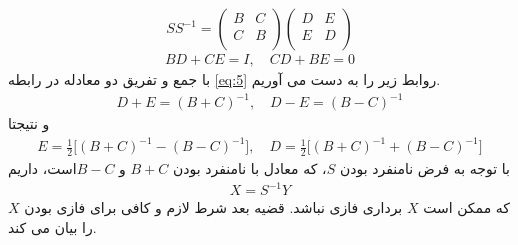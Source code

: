 	\[
	SS^{-1} = 
	\begin{pmatrix}
	B & C \\ 
	C & B \\  
	\end{pmatrix}
	\begin{pmatrix}
	D & E \\ 
	E & D \\
	\end{pmatrix}
	\]
	\begin{align}
	\label{eq:5}
	BD + CE = I, \quad CD + BE = 0 
	\end{align} 
	با جمع و تفریق دو معادله در رابطه \ref{eq:5} روابط زیر را به دست می آوریم. 
	\begin{align}
	\label{eq:6}
	D + E = (B + C)^{-1}, \quad D - E = (B - C)^{-1}
	\end{align} 
	و نتیجتا 
	\begin{align}
	\label{eq:7}
	E = \frac{1}{2}\lbrack(B + C)^{-1} - (B - C)^{-1}\rbrack, \quad 
	D = \frac{1}{2}\lbrack(B + C)^{-1} + (B - C)^{-1}\rbrack
	\end{align} 
	با توجه به فرض نامنفرد بودن $ S $، که معادل با نامنفرد بودن $ B + C $ و $ B - C $است،‌ داریم 
	\begin{align}
	\label{eq:8}
	X = S^{-1}Y
	\end{align} 
	که ممکن است $ X $ برداری فازی نباشد. قضیه بعد شرط لازم و کافی برای فازی بودن $ X $ را بیان می کند. 
	
